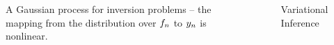 \documentclass[final]{beamer}
\newlength{\sepwid}
\newlength{\onecolwid}
\newlength{\twocolwid}
\begin{document}
\begin{frame}[t]
\begin{columns}[t]
\begin{column}{\onecolwid}
\begin{figure}

    
    \label{fig:gp}

    \caption{A Gaussian process for inversion problems -- the mapping from the
        distribution over $f_n$ to $y_n$ is nonlinear.}
\end{figure}



\end{column} %

\begin{column}{\sepwid}\end{column} %

\begin{column}{\twocolwid} %

\begin{columns}[t,totalwidth=\twocolwid] %

\begin{column}{\onecolwid}\vspace{-.6in} %



\begin{block}{Variational Inference}


\end{block}
\end{column}
\end{columns}
\end{column}
\end{columns}
\end{frame}
\end{document}
